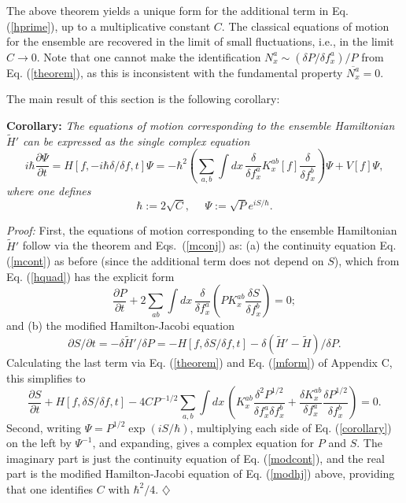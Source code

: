 \documentclass[a4paper,preprint, showpacs, aps, draft]{revtex4}
\begin{document}
{The above theorem yields a unique form for the additional term in Eq.
(\ref{hprime}), up to a multiplicative constant $C$.  The classical
equations of motion for the ensemble are recovered in the limit of small
fluctuations, i.e., in the limit
$C\rightarrow0$.  Note that one cannot make the identification 
$N^a_x\sim(\delta P/\delta f^a_x)/P$ from Eq. (\ref{theorem}),
as this is inconsistent with the fundamental property
$\overline{N^a_x}=0$.

The main result of this section is the following
corollary:

{\bf Corollary:} {\it The equations of motion corresponding to the
ensemble Hamiltonian $\tilde{H}'$ can be expressed as the single complex
equation}
\begin{equation} \label{corollary}
i\hbar\frac{\partial\Psi}{\partial t} =
H[f,-i\hbar\delta/\delta f, t] \Psi = -\hbar^2 \left(\sum_{a,b}\int dx\,
\frac{\delta}{\delta f^a_x} K^{ab}_x[f] \frac{\delta}{\delta f^b_x}
\right) \Psi +
V[f]\Psi ,
\end{equation}
{\it where one defines}
\begin{equation} \label{hdef}
\hbar := 2\sqrt{C},~~~~~~\Psi := \sqrt{P} e^{iS/\hbar} .
\end{equation}

{\it Proof:} First, the equations of motion corresponding
to the ensemble Hamiltonian $\tilde{H}'$ follow via the theorem and
Eqs.~(\ref{mconj}) as: (a) the continuity
equation Eq. (\ref{mcont}) as before (since the additional term does not
depend on $S$), which from Eq. (\ref{hquad}) has the explicit form
\begin{equation} \label{modcont}
\frac{\partial P}{\partial t} + 2\sum_{ab}\int
dx\,\frac{\delta}{\delta f^a_x}\left( PK^{ab}_x\frac{\delta S}{\delta
f^b_x}\right) = 0 ;
\end{equation}
and (b) the modified Hamilton-Jacobi equation
\[ \partial S/\partial t = -\delta\tilde{H}'/\delta P = -H[f,\delta
S/\delta f,t] - \delta(\tilde{H}'-\tilde{H})/\delta P .\]
Calculating the last term via Eq. (\ref{theorem}) and 
Eq. (\ref{mform}) of Appendix C, this
simplifies to
\begin{equation} \label{modhj}
\frac{\partial S}{\partial t}+H[f, \delta S/\delta f,t]
-4CP^{-1/2} \sum_{a,b}
\int dx\,\left(K^{ab}_x\frac{\delta^2 P^{1/2}}{\delta f^a_x \delta f^b_x}
+\frac{\delta K^{ab}_x}{\delta f^a_x}\frac{\delta P^{1/2}}{\delta f^b_x}
\right) =0 .
\end{equation}
Second, writing $\Psi=P^{1/2}\exp(iS/\hbar)$, multiplying each side of
Eq. (\ref{corollary}) 
on the left by $\Psi^{-1}$, and expanding, gives a complex equation for
$P$ and $S$. The imaginary part is just the continuity
equation of Eq. (\ref{modcont}), and the real part is the modified
Hamilton-Jacobi equation of Eq. (\ref{modhj}) above, providing that one
identifies $C$ with $\hbar^2/4$.
$\diamondsuit$

}
\end{document}
